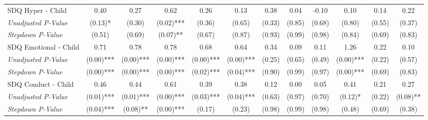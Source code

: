 \begin{tabular}{l c c c c c c c c c c c}
SDQ Hyper - Child & 0.40 & 0.27 & 0.62 & 0.26 & 0.13 & 0.38 & 0.04 & -0.10 & 0.10 & 0.14 & 0.22 \\
\quad \textit{Unadjusted P-Value} & (0.13)* & (0.30) & (0.02)*** & (0.36) & (0.65) & (0.33) & (0.85) & (0.68) & (0.80) & (0.55) & (0.37) \\
\quad \textit{Stepdown P-Value} & (0.51) & (0.69) & (0.07)** & (0.67) & (0.87) & (0.93) & (0.99) & (0.98) & (0.84) & (0.69) & (0.83) \\
SDQ Emotional - Child & 0.71 & 0.78 & 0.78 & 0.68 & 0.64 & 0.34 & 0.09 & 0.11 & 1.26 & 0.22 & 0.10 \\
\quad \textit{Unadjusted P-Value} & (0.00)*** & (0.00)*** & (0.00)*** & (0.00)*** & (0.00)*** & (0.25) & (0.65) & (0.49) & (0.00)*** & (0.22) & (0.57) \\
\quad \textit{Stepdown P-Value} & (0.00)*** & (0.00)*** & (0.00)*** & (0.02)*** & (0.04)*** & (0.90) & (0.99) & (0.97) & (0.00)*** & (0.69) & (0.83) \\
SDQ Conduct - Child & 0.46 & 0.44 & 0.61 & 0.39 & 0.38 & 0.12 & 0.00 & 0.05 & 0.41 & 0.21 & 0.27 \\
\quad \textit{Unadjusted P-Value} & (0.01)*** & (0.01)*** & (0.00)*** & (0.03)*** & (0.04)*** & (0.63) & (0.97) & (0.70) & (0.12)* & (0.22) & (0.08)** \\
\quad \textit{Stepdown P-Value} & (0.04)*** & (0.08)** & (0.00)*** & (0.17) & (0.23) & (0.98) & (0.99) & (0.98) & (0.48) & (0.69) & (0.38) \\
\bottomrule
\end{tabular}
